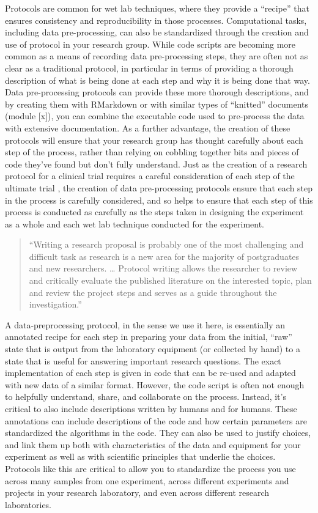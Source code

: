 \documentclass[]{tufte-book}
\begin{document}
Protocols are common for wet lab techniques, where they provide a ``recipe'' that
ensures consistency and reproducibility in those processes. Computational tasks,
including data pre-processing, can also be standardized through the creation and
use of protocol in your research group. While code scripts are becoming more
common as a means of recording data pre-processing steps, they are often not
as clear as a traditional protocol, in particular in terms of providing a
thorough description of what is being done at each step and why it is being
done that way. Data pre-processing protocols can provide these more thorough
descriptions, and by creating them with RMarkdown or with similar types
of ``knitted'' documents (module {[}x{]}), you can combine the executable code
used to pre-process the data with extensive documentation. As a further
advantage, the creation of these protocols will ensure that your research
group has thought carefully about each step of the process, rather than
relying on cobbling together bits and pieces of code they've found but don't
fully understand. Just as the creation of a research protocol for a
clinical trial requires a careful consideration of each step of the ultimate
trial \citep{al2016protocol}, the creation of data pre-processing protocols ensure
that each step in the process is carefully considered, and so helps to
ensure that each step of this process is conducted as carefully as the
steps taken in designing the experiment as a whole and each wet lab technique
conducted for the experiment.

\begin{quote}
``Writing a research proposal is probably one of the most challenging and
difficult task as research is a new area for the majority of postgraduates and
new researchers. \ldots{} Protocol writing allows the researcher to review and
critically evaluate the published literature on the interested topic, plan and
review the project steps and serves as a guide throughout the investigation.''
\citep{al2016protocol}
\end{quote}

A data-preprocessing protocol, in the sense we use it here, is essentially an
annotated recipe for each step in preparing your data from the initial, ``raw''
state that is output from the laboratory equipment (or collected by hand) to a
state that is useful for answering important research questions. The exact
implementation of each step is given in code that can be re-used and adapted
with new data of a similar format. However, the code script is often not enough
to helpfully understand, share, and collaborate on the process. Instead, it's
critical to also include descriptions written by humans and for humans. These
annotations can include descriptions of the code and how certain parameters are
standardized the algorithms in the code. They can also be used to justify
choices, and link them up both with characteristics of the data and equipment
for your experiment as well as with scientific principles that underlie the
choices. Protocols like this are critical to allow you to standardize the
process you use across many samples from one experiment, across different
experiments and projects in your research laboratory, and even across different
research laboratories.
\end{document}
